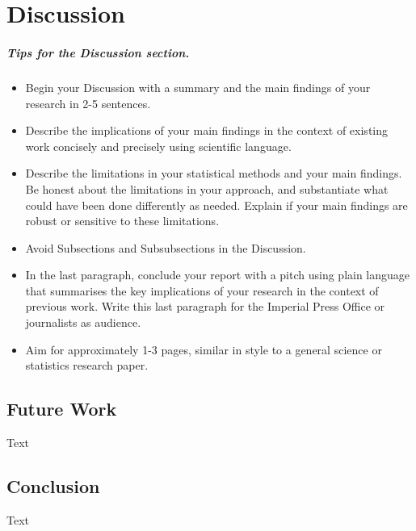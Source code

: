 \chapter{Discussion}

\paragraph{Tips for the Discussion section.} 

\begin{itemize}
    \item Begin your Discussion with a summary and the main findings of your research in 2-5 sentences.
    \item Describe the implications of your main findings in the context of existing work concisely and precisely using scientific language. 
    \item Describe the limitations in your statistical methods and your main findings. Be honest about the limitations in your approach, and substantiate what could have been done differently as needed. Explain if your main findings are robust or sensitive to these limitations.
    \item Avoid Subsections and Subsubsections in the Discussion.
    \item In the last paragraph, conclude your report with a pitch using plain language that summarises the key implications of your research in the context of previous work. Write this last paragraph for the Imperial Press Office or journalists as audience.
    \item Aim for approximately 1-3 pages, similar in style to a general science or statistics research paper.
\end{itemize}

\section{Future Work}

Text

\section{Conclusion}

Text
